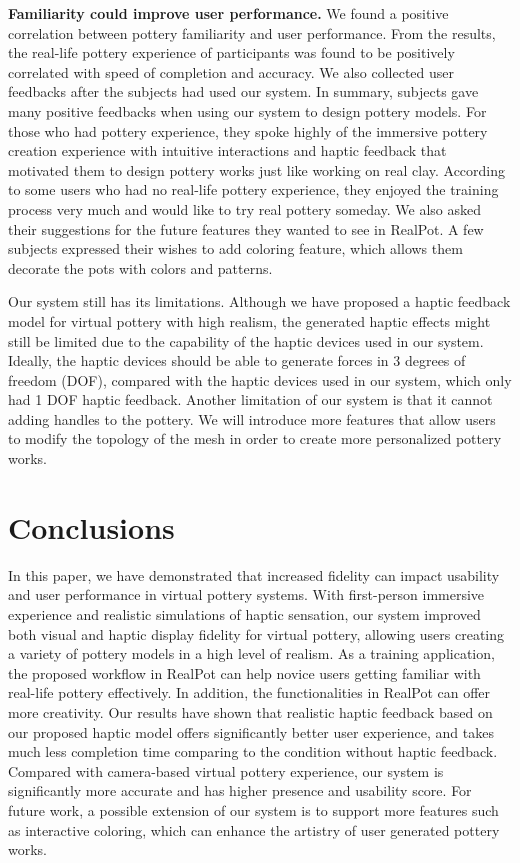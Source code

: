 \documentclass{svjour3}                     %
\begin{document}
\textbf{Familiarity could improve user performance.}
We found a positive correlation between pottery familiarity and user performance.
%
{\color{blue}
From the results, the real-life pottery experience of participants was found to be positively correlated with speed of completion and accuracy.	
} 
%
We also collected user feedbacks after the subjects had used our system.
In summary, subjects gave many positive feedbacks when using our system to design pottery models.
For those who had pottery experience, they spoke highly of the immersive pottery creation experience with intuitive interactions and haptic feedback that motivated them to design pottery works just like working on real clay.
According to some users who had no real-life pottery experience, they enjoyed the training process very much and would like to try real pottery someday.
We also asked their suggestions for the future features they wanted to see in RealPot.
A few subjects expressed their wishes to add coloring feature, which allows them decorate the pots with colors and patterns.

Our system still has its limitations. Although we have proposed a haptic feedback model for virtual pottery with high realism, the generated haptic effects might still be limited due to the capability of the haptic devices used in our system. Ideally, the haptic devices should be able to generate forces in 3 degrees of freedom (DOF), compared with the haptic devices used in our system, which only had 1 DOF haptic feedback.
%
Another limitation of our system is that it cannot adding handles to the pottery. We will introduce more features that allow users to modify the topology of the mesh in order to create more personalized pottery works.

\section{Conclusions}
\label{sec:conclusion}

In this paper, we have demonstrated that increased fidelity can impact usability and user performance in virtual pottery systems.
With first-person immersive experience and realistic simulations of haptic sensation, our system improved both visual and haptic display fidelity for virtual pottery, allowing users creating a variety of pottery models in a high level of realism.
As a training application, the proposed workflow in RealPot can help novice users getting familiar with real-life pottery effectively. In addition, the functionalities in RealPot can offer more creativity.
%
Our results have shown that realistic haptic feedback based on our proposed haptic model offers significantly better user experience, and takes much less completion time comparing to the condition without haptic feedback.
%
Compared with camera-based virtual pottery experience, our system is significantly more accurate and has higher presence and usability score.
%
For future work, a possible extension of our system is to support more features such as interactive coloring, which can enhance the artistry of user generated pottery works.
\end{document}
